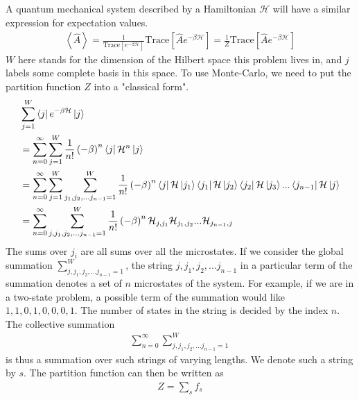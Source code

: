 \documentclass{article}
\numberwithin{equation}{section}
\begin{document}
A quantum mechanical system described by a Hamiltonian \(\mathcal{H}\) will have a similar expression for expectation values.
\begin{equation}\begin{aligned}
	\left<\hat A \right> = \frac{1}{ \text{Trace}\left[ e^{-\beta \mathcal{H}} \right]} \text{Trace}\left[ \hat A e^{-\beta \mathcal{H}} \right] = \frac{1}{Z}\text{Trace}\left[ \hat A e^{-\beta \mathcal{H}} \right]
\end{aligned}\end{equation}
\(W\) here stands for the dimension of the Hilbert space this problem lives in, and \(j\) labels some complete basis in this space. To use Monte-Carlo, we need to put the partition function \(Z\) into a "classical form".
\begin{equation}\begin{aligned}
	&\sum_{j=1}^W \bra{j} e^{-\beta \mathcal{H}}\ket{j}\\
	&= \sum_{n=0}^\infty \sum_{j=1}^W \frac{1}{n!} \left( -\beta \right)^n \bra{j} \mathcal{H}^n \ket{j}\\
	&= \sum_{n=0}^\infty \sum_{j=1}^W \sum_{j_1,j_2,...j_{n-1}=1}^W \frac{1}{n!} \left( -\beta \right)^n \bra{j} \mathcal{H} \ket{j_1}\bra{j_1}\mathcal{H}\ket{j_2}\bra{j_2}\mathcal{H}\ket{j_3}...\bra{j_{n-1}}\mathcal{H}\ket{j}\\
	&= \sum_{n=0}^\infty\sum_{j,j_1,j_2,...j_{n-1}=1}^W \frac{1}{n!} \left( -\beta \right)^n \mathcal{H}_{j,j_1}\mathcal{H}_{j_1,j_2}...\mathcal{H}_{j_{n-1},j}\\
\end{aligned}\end{equation}
The sums over \(j_i\) are all sums over all the microstates. If we consider the global summation \(\sum_{j,j_1,j_2,...j_{n-1}=1}^W\), the string \(j,j_1,j_2,...j_{n-1}\) in a particular term of the summation denotes a set of \(n\) microstates of the system. For example, if we are in a two-state problem, a possible term of the summation would like \(1,1,0,1,0,0,0,1\). The number of states in the string is decided by the index \(n\). The collective summation 
\begin{equation}\begin{aligned}
	\sum_{n=0}^\infty\sum_{j,j_1,j_2,...j_{n-1}=1}^W
\end{aligned}\end{equation}
is thus a summation over such strings of varying lengths. We denote such a string by \(s\). The partition function can then be written as
\begin{equation}\begin{aligned}
	\label{class}
	Z = \sum_s f_s
\end{aligned}\end{equation}
\end{document}
